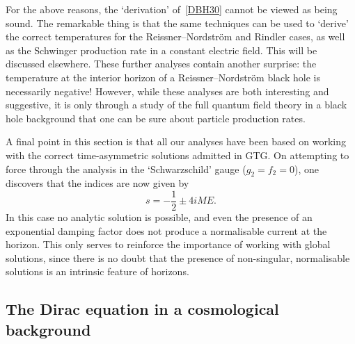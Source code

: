 \documentclass[a4paper]{article}
\numberwithin{equation}{section}
\newcommand{\half}{{\textstyle \frac{1}{2}}}
\begin{document}
For the above reasons, the `derivation' of~\eqref{DBH30} cannot be viewed
as being sound.  The remarkable thing is that the same techniques can
be used to `derive' the correct temperatures for the
Reissner--Nordstr\"{o}m and Rindler cases, as well as the Schwinger
production rate in a constant electric field.  This will be discussed
elsewhere.  These further analyses contain another surprise: the
temperature at the interior horizon of a Reissner--Nordstr\"{o}m black
hole is necessarily negative!  However, while these analyses are both
interesting and suggestive, it is only through a study of the full
quantum field theory in a black hole background that one can be sure
about particle production rates.  


A final point in this section is that all our analyses have been based
on working with the correct time-asymmetric solutions admitted in GTG.
On attempting to force through the analysis in the `Schwarzschild'
gauge ($g_2=f_2=0$), one discovers that the indices are now given by
%
\begin{equation}
s = -\half \pm 4iME .
\end{equation}
%
In this case no analytic solution is possible, and even the presence
of an exponential damping factor does not produce a normalisable
current at the horizon.  This only serves to reinforce the importance
of working with global solutions, since there is no doubt that the
presence of non-singular, normalisable solutions is an intrinsic
feature of horizons.


\subsection{The Dirac equation in a cosmological background}
\label{DE-COS}
\end{document}
